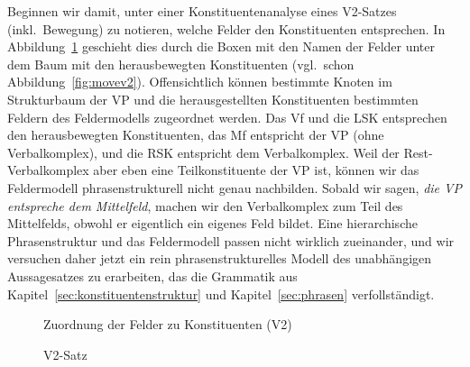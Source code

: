 Beginnen wir damit, unter einer Konstituentenanalyse eines V2-Satzes (inkl.\ Bewegung) zu notieren, welche Felder den Konstituenten entsprechen.
In Abbildung~\ref{fig:movev2konstituenten} geschieht dies durch die Boxen mit den Namen der Felder unter dem Baum mit den herausbewegten Konstituenten (vgl.\ schon Abbildung~\ref{fig:movev2}).
Offensichtlich können bestimmte Knoten im Strukturbaum der VP und die herausgestellten Konstituenten bestimmten Feldern des Feldermodells zugeordnet werden.
Das Vf und die LSK entsprechen den herausbewegten Konstituenten, das Mf entspricht der VP (ohne Verbalkomplex), und die RSK entspricht dem Verbalkomplex.
Weil der Rest-Verbalkomplex aber eben eine Teilkonstituente der VP ist, können wir das Feldermodell phrasenstrukturell nicht genau nachbilden.
Sobald wir sagen, \textit{die VP entspreche dem Mittelfeld}, machen wir den Verbalkomplex zum Teil des Mittelfelds, obwohl er eigentlich ein eigenes Feld bildet.
Eine hierarchische Phrasenstruktur und das Feldermodell passen nicht wirklich zueinander, und wir versuchen daher jetzt ein rein phrasenstrukturelles Modell des unabhängigen Aussagesatzes zu erarbeiten, das die Grammatik aus Kapitel~\ref{sec:konstituentenstruktur} und Kapitel~\ref{sec:phrasen} verfollständigt.

\begin{figure}
  \caption{Zuordnung der Felder zu Konstituenten (V2)}
  \label{fig:movev2konstituenten}
\end{figure}

\begin{figure}
  \vspace{0.3cm}
  \caption{V2-Satz}
  \label{fig:v2satz}
\end{figure}

